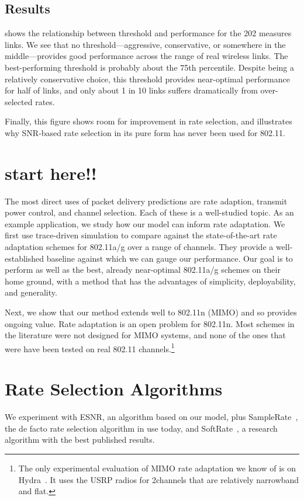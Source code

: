 \subsection{Results}
 shows the relationship between threshold and performance for the 202 measures links. We see that no threshold---aggressive, conservative, or somewhere in the middle---provides good performance across the range of real wireless links. The best-performing threshold is probably about the 75th percentile. Despite being a relatively conservative choice, this threshold provides near-optimal performance for half of links, and only about 1 in 10 links suffers dramatically from over-selected rates.

Finally, this figure shows room for improvement in rate selection, and illustrates why SNR-based rate selection in its pure form has never been used for 802.11. 

\section{start here!!}
The most direct uses of packet delivery predictions are rate adaption, transmit power control, and channel selection. Each of these is a well-studied topic. As an example application, we study how our model can inform rate adaptation. We first use trace-driven simulation to compare against the state-of-the-art rate adaptation schemes for 802.11a/g over a range of channels. They provide a well-established baseline against which we can gauge our performance. Our goal is to perform as well as the best, already near-optimal 802.11a/g schemes on their home ground, with a method that has the advantages of simplicity, deployability, and generality.

Next, we show that our method extends well to 802.11n (MIMO) and so provides ongoing value. Rate adaptation is an open problem for 802.11n. Most schemes in the literature were not designed for MIMO systems, and none of the ones that were have been tested on real 802.11 channels.\footnote{The only experimental evaluation of MIMO rate adaptation we know of is on Hydra~\cite{Kim_Hydra}. It uses the USRP radios for 2\MHz channels that are relatively narrowband and flat.} 

\section{Rate Selection Algorithms}
We experiment with ESNR, an algorithm based on our model, plus SampleRate~\cite{Bicket_SampleRate}, the de facto rate selection algorithm in use today, and SoftRate~\cite{Vutukuru_SoftRate}, a research algorithm with the best published results.


